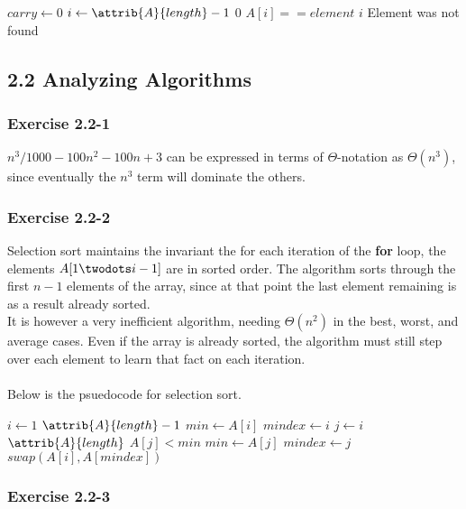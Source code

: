 \documentclass{article}
\begin{document}
\begin{codebox}
\li $carry \gets 0$
\li \For $i \gets \attrib{A}{length}-1$ \Downto  $0$
\li \Do
        \If $A[i] == element$
\li     \Do
            \Return $i$
        \End
    \End
\li \Comment Element was not found
\li \Return {} 
\end{codebox}

\subsection*{2.2 Analyzing Algorithms}
\subsubsection*{Exercise 2.2-1}

$n^3 / 1000 - 100n^2 - 100n + 3$ can be expressed in terms of $\Theta$-notation as $\Theta(n^3)$, since eventually the $n^3$ term will dominate the others.

\subsubsection*{Exercise 2.2-2}

Selection sort maintains the invariant the for each iteration of the \textbf{for} loop, the elements $A[1 \twodots i-1]$ are in sorted order. The algorithm sorts through the first $n-1$ elements of the array, since at that point the last element remaining is as a result already sorted. \\
It is however a very inefficient algorithm, needing $\Theta(n^2)$ in the best, worst, and average cases. Even if the array is already sorted, the algorithm must still step over each element to learn that fact on each iteration. \\
\\
Below is the psuedocode for selection sort.

\begin{codebox}
\li \For $i \gets 1$ \To $\attrib{A}{length}-1$
\li \Do
        $min \gets A[i]$
\li     $mindex \gets i$
\li     \For $j \gets i$ \To $\attrib{A}{length}$
\li     \Do
            \If $A[j] < min$
\li         \Do
                $min \gets A[j]$
\li             $mindex \gets j$
            \End
        \End
\li     $swap(A[i], A[mindex])$
    \End
\end{codebox} 

\subsubsection*{Exercise 2.2-3}
\end{document}
